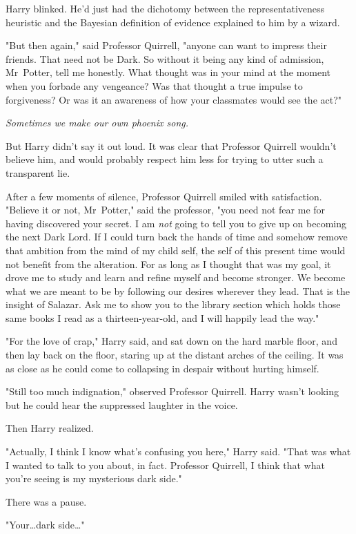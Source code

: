 Harry blinked. He'd just had the dichotomy between the representativeness
heuristic and the Bayesian definition of evidence explained to him by a wizard.

"But then again," said Professor Quirrell, "anyone can want to impress their
friends. That need not be Dark. So without it being any kind of admission,
Mr~Potter, tell me honestly. What thought was in your mind at the moment when
you forbade any vengeance? Was that thought a true impulse to forgiveness? Or
was it an awareness of how your classmates would see the act?"

\emph{Sometimes we make our own phoenix song.}

But Harry didn't say it out loud. It was clear that Professor Quirrell wouldn't
believe him, and would probably respect him less for trying to utter such a
transparent lie.

After a few moments of silence, Professor Quirrell smiled with satisfaction.
"Believe it or not, Mr~Potter," said the professor, "you need not fear me for
having discovered your secret. I am \emph{not} going to tell you to give up on
becoming the next Dark Lord. If I could turn back the hands of time and somehow
remove that ambition from the mind of my child self, the self of this present
time would not benefit from the alteration. For as long as I thought that was
my goal, it drove me to study and learn and refine myself and become stronger.
We become what we are meant to be by following our desires wherever they lead.
That is the insight of Salazar. Ask me to show you to the library section which
holds those same books I read as a thirteen-year-old, and I will happily lead
the way."

"For the love of crap," Harry said, and sat down on the hard marble floor, and
then lay back on the floor, staring up at the distant arches of the ceiling. It
was as close as he could come to collapsing in despair without hurting himself.

"Still too much indignation," observed Professor Quirrell. Harry wasn't looking
but he could hear the suppressed laughter in the voice.

Then Harry realized.

"Actually, I think I know what's confusing you here," Harry said. "That was
what I wanted to talk to you about, in fact. Professor Quirrell, I think that
what you're seeing is my mysterious dark side."

There was a pause.

"Your…dark side…"

